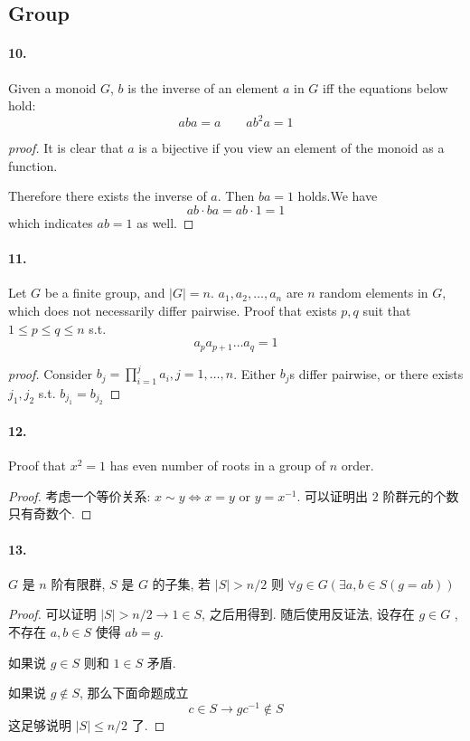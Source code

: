 \documentclass[12pt]{ctexart}
\theoremstyle{definition}
\theoremstyle{definition}
\theoremstyle{plain}
\theoremstyle{remark}
\begin{document}
\subsection{Group}
\paragraph{10.} Given a monoid \(G\), \(b\) is the inverse of an element \(a\) in \(G\) iff the equations below hold:
\begin{equation}
a b a = a \qquad a b^{2} a = 1
\end{equation}
\begin{proof}[proof]
It is clear that \(a\) is a bijective if you view an element of the monoid as a function. 

Therefore there exists the inverse of \(a\). Then \(ba = 1\) holds.We have 
\[
ab \cdot ba = ab \cdot 1 = 1
\]
which indicates \(ab = 1\) as well. 
\end{proof}
\paragraph{11.} Let \(G\) be a finite group, and \(|G| = n\). 
\(a_{1}, a_{2} , \dots, a_{n}\) are \(n\) random elements in \(G\), which does not necessarily differ pairwise. Proof that exists \(p , q\) suit that \(1 \le p \le q \le n\) s.t. 
\[
a _{p} a _{p+1} \dots a _{q} = 1
\]
\begin{proof}[proof]
Consider \(b _{j} = \prod _{i = 1} ^{j} a _{i}, j = 1, \dots , n\).
Either \(b_{j}\)s differ pairwise, or there exists \(j_{1}, j_{2}\) s.t. \(b_{j_{1}} = b_{j_{2}}\)
\end{proof}

\paragraph{12.} Proof that \(x^{2} = 1\) has even number of roots in a group of \(n\) order.
\begin{proof}
	考虑一个等价关系: \(x \sim y \iff x = y \text{ or } y = x ^{-1} \). 可以证明出 \(2\) 阶群元的个数只有奇数个. 
\end{proof}

\paragraph{13.} \(G\) 是 \(n\) 阶有限群, \(S\) 是 \(G\) 的子集, 若 \(|S| > n / 2\) 则 \(\forall g\in G (\exists a, b \in S (g = ab))\)
\begin{proof}
可以证明 \(|S| > n/2 \to 1 \in S\), 之后用得到. 
	随后使用反证法, 设存在 \(g\in G\) , 不存在 \(a , b \in S\) 使得 \(ab = g\). 
	
	如果说 \(g \in S\) 则和 \(1 \in S\) 矛盾. 

	如果说 \(g \notin S\), 那么下面命题成立
	\[
		c \in S \to g c ^{-1} \notin S
	\]
	这足够说明 \(|S| \le n / 2\) 了. 
\end{proof}
\end{document}

